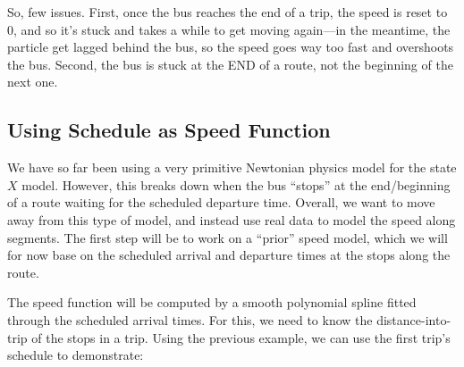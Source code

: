\documentclass[11pt]{article}\usepackage[]{graphicx}\usepackage[]{color}
\begin{document}
So, few issues. First, once the bus reaches the end of a trip, the speed is reset to 0, and so it's
stuck and takes a while to get moving again---in the meantime, the particle get lagged behind the
bus, so the speed goes way too fast and overshoots the bus.
Second, the bus is stuck at the END of a route, not the beginning of the next one.


\subsection{Using Schedule as Speed Function}

We have so far been using a very primitive Newtonian physics model for the state $X$ model.
However, this breaks down when the bus ``stops'' at the end/beginning of a route waiting for the
scheduled departure time.
Overall, we want to move away from this type of model, and instead use real data to model the speed
along segments.
The first step will be to work on a ``prior'' speed model, which we will for now base on the
scheduled arrival and departure times at the stops along the route.

The speed function will be computed by a smooth polynomial spline fitted through the scheduled
arrival times.
For this, we need to know the distance-into-trip of the stops in a trip.
Using the previous example, we can use the first trip's schedule to demonstrate:
\end{document}
